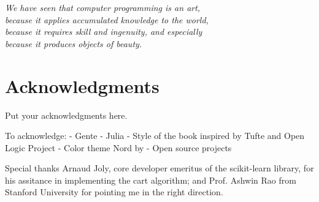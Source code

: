 
\begin{flushright}{\slshape
    We have seen that computer programming is an art, \\
    because it applies accumulated knowledge to the world, \\
    because it requires skill and ingenuity, and especially \\
    because it produces objects of beauty.} \\ \medskip
\end{flushright}



\bigskip

{
    \chapter*{Acknowledgments}
    Put your acknowledgments here.

    To acknowledge:
    - Gente
    - Julia
    - Style of the book inspired by Tufte and Open Logic Project
    - Color theme Nord by
    - Open source projects

    \bigskip

    Special thanks Arnaud Joly, core developer emeritus of the scikit-learn
    library, for his assitance in implementing the \ac{cart} algorithm; and Prof.
    Ashwin Rao from Stanford University for pointing me in the right direction.
}